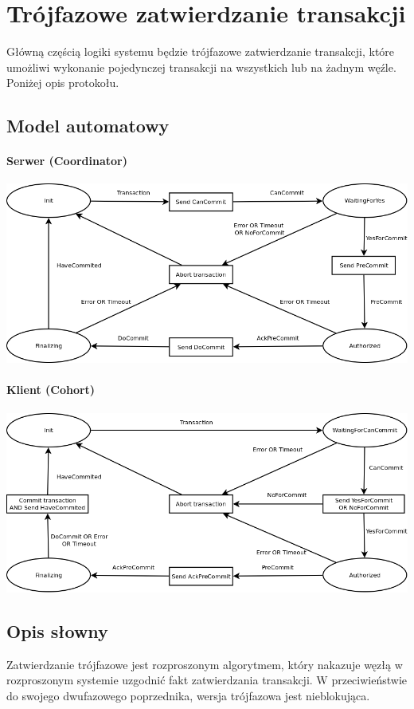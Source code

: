 \documentclass[a4paper, oneside, 11pt]{report}
\begin{document}
\chapter{Trójfazowe zatwierdzanie transakcji}
Główną częścią logiki systemu będzie trójfazowe zatwierdzanie transakcji, które umożliwi wykonanie pojedynczej transakcji na wszystkich lub na żadnym węźle. Poniżej opis protokołu.
\section{Model automatowy}
\subsubsection{Serwer (Coordinator)}
\includegraphics[width=15cm]{3PC-serwer.png}
\subsubsection{Klient (Cohort)}
\includegraphics[width=15cm]{3PC-klient.png}
\section{Opis słowny}
Zatwierdzanie trójfazowe jest rozproszonym algorytmem, który nakazuje węzłą w rozproszonym systemie uzgodnić fakt zatwierdzania transakcji. W przeciwieństwie do swojego dwufazowego poprzednika, wersja trójfazowa jest nieblokująca. 
\end{document}
